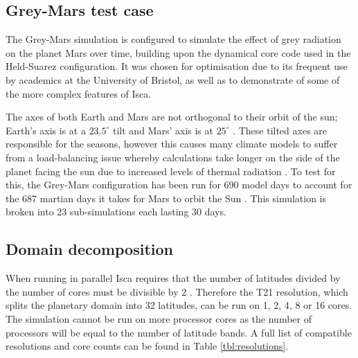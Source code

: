 \documentclass[a4paper,11pt]{report}
\begin{document}
\subsection{Grey-Mars test case}
\label{sec:grey-mars-conf}
The Grey-Mars simulation is configured to simulate the effect of grey radiation on the planet Mars over time, building upon the dynamical core code used in the Held-Suarez configuration. It was chosen for optimisation due to its frequent use by academics at the University of Bristol, as well as to demonstrate of some of the more complex features of Isca. 
\par
The axes of both Earth and Mars are not orthogonal to their orbit of the sun; Earth's axis is at a $23.5^{\circ}$ tilt and Mars' axis is at $25^{\circ}$ \cite{laskar1993chaotic}.  These tilted axes are responsible for the seasons, however this causes many climate models to suffer from a load-balancing issue whereby calculations take longer on the side of the planet facing the sun due to increased levels of thermal radiation \cite{foster1994load}. To test for this, the Grey-Mars configuration has been run for 690 model days to account for the 687 martian days it takes for Mars to orbit the Sun \cite{meeus1991astronomical}. This simulation is broken into 23 sub-simulations each lasting 30 days. 

\subsection{Domain decomposition}
When running in parallel Isca requires that the number of latitudes divided by the number of cores must be divisible by 2 \cite{isca2019github}. Therefore the T21 resolution, which splits the planetary domain into 32 latitudes, can be run on 1, 2, 4, 8 or 16 cores. The simulation cannot be run on more processor cores as the number of processors will be equal to the number of latitude bands. A full list of compatible resolutions and core counts can be found in Table \ref{tbl:resolutions}.
\end{document}

